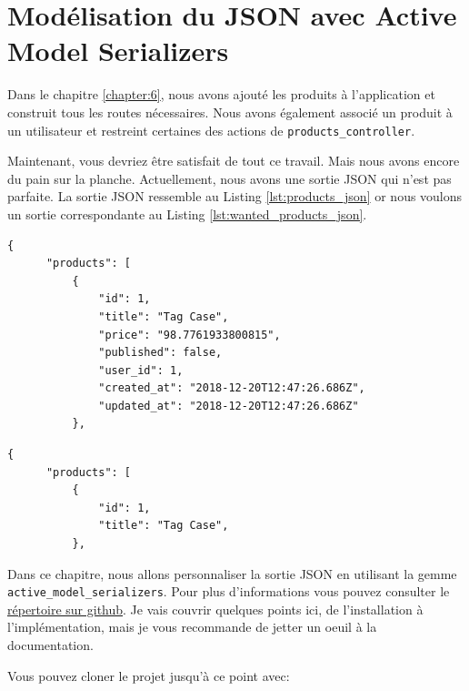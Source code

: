 \documentclass[]{report}
\begin{document}
\chapter{Modélisation du JSON avec Active Model Serializers}\label{chapter:7}

  Dans le chapitre \ref{chapter:6}, nous avons ajouté les produits à l'application et construit tous les routes nécessaires. Nous avons également associé un produit à un utilisateur et restreint certaines des actions de \verb|products_controller|.

  Maintenant, vous devriez être satisfait de tout ce travail. Mais nous avons encore du pain sur la planche. Actuellement, nous avons une sortie JSON qui n'est pas parfaite. La sortie JSON ressemble au Listing \ref{lst:products_json} or nous voulons un sortie correspondante au Listing \ref{lst:wanted_products_json}.

  \begin{scriptsize}
    \begin{lstlisting}[caption={Exemple de la sortie JSON actuelle pour la route products}, label={lst:products_json}]
    {
      "products": [
          {
              "id": 1,
              "title": "Tag Case",
              "price": "98.7761933800815",
              "published": false,
              "user_id": 1,
              "created_at": "2018-12-20T12:47:26.686Z",
              "updated_at": "2018-12-20T12:47:26.686Z"
          },
    \end{lstlisting}
  \end{scriptsize}

  \begin{scriptsize}
    \begin{lstlisting}[caption={Exemple d'une belle sortie JSON pour la route products}, label={lst:wanted_products_json}]
    {
      "products": [
          {
              "id": 1,
              "title": "Tag Case",
          },
    \end{lstlisting}
  \end{scriptsize}

  Dans ce chapitre, nous allons personnaliser la sortie JSON en utilisant la gemme \verb|active_model_serializers|. Pour plus d'informations vous pouvez consulter le \href{https://github.com/rails-api/active_model_serializers}{répertoire sur github}. Je vais couvrir quelques points ici, de l'installation à l'implémentation, mais je vous recommande de jetter un oeuil à la documentation.

  Vous pouvez cloner le projet jusqu'à ce point avec:
\end{document}
